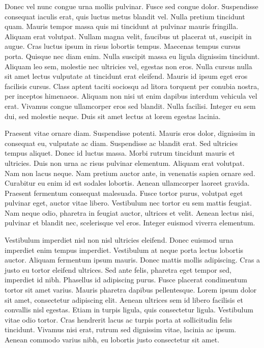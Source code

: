 Donec vel nunc congue urna mollis pulvinar.
Fusce sed congue dolor.
Suspendisse consequat iaculis erat, quis luctus metus blandit vel.
Nulla pretium tincidunt quam.
Mauris tempor massa quis mi tincidunt at pulvinar mauris fringilla.
Aliquam erat volutpat.
Nullam magna velit, faucibus ut placerat ut, suscipit in augue.
Cras luctus ipsum in risus lobortis tempus.
Maecenas tempus cursus porta.
Quisque nec diam enim.
Nulla suscipit massa eu ligula dignissim tincidunt.
Aliquam leo sem, molestie nec ultricies vel, egestas non eros.
Nulla cursus nulla sit amet lectus vulputate at tincidunt erat eleifend.
Mauris id ipsum eget eros facilisis cursus.
Class aptent taciti sociosqu ad litora torquent per conubia nostra, per inceptos himenaeos.
Aliquam non nisi ut enim dapibus interdum vehicula vel erat.
Vivamus congue ullamcorper eros sed blandit.
Nulla facilisi.
Integer eu sem dui, sed molestie neque.
Duis sit amet lectus at lorem egestas lacinia.

Praesent vitae ornare diam.
Suspendisse potenti.
Mauris eros dolor, dignissim in consequat eu, vulputate ac diam.
Suspendisse ac blandit erat.
Sed ultricies tempus aliquet.
Donec id luctus massa.
Morbi rutrum tincidunt mauris et ultricies.
Duis non urna ac risus pulvinar elementum.
Aliquam erat volutpat.
Nam non lacus neque.
Nam pretium auctor ante, in venenatis sapien ornare sed.
Curabitur eu enim id est sodales lobortis.
Aenean ullamcorper laoreet gravida.
Praesent fermentum consequat malesuada.
Fusce tortor purus, volutpat eget pulvinar eget, auctor vitae libero.
Vestibulum nec tortor eu sem mattis feugiat.
Nam neque odio, pharetra in feugiat auctor, ultrices et velit.
Aenean lectus nisi, pulvinar et blandit nec, scelerisque vel eros.
Integer euismod viverra elementum.

Vestibulum imperdiet nisl non nisl ultricies eleifend.
Donec euismod urna imperdiet enim tempus imperdiet.
Vestibulum at neque porta lectus lobortis auctor.
Aliquam fermentum ipsum mauris.
Donec mattis mollis adipiscing.
Cras a justo eu tortor eleifend ultrices.
Sed ante felis, pharetra eget tempor sed, imperdiet id nibh.
Phasellus id adipiscing purus.
Fusce placerat condimentum tortor sit amet varius.
Mauris pharetra dapibus pellentesque.
Lorem ipsum dolor sit amet, consectetur adipiscing elit.
Aenean ultrices sem id libero facilisis et convallis nisl egestas.
Etiam in turpis ligula, quis consectetur ligula.
Vestibulum vitae odio tortor.
Cras hendrerit lacus ac turpis porta at sollicitudin felis tincidunt.
Vivamus nisi erat, rutrum sed dignissim vitae, lacinia ac ipsum.
Aenean commodo varius nibh, eu lobortis justo consectetur sit amet.

